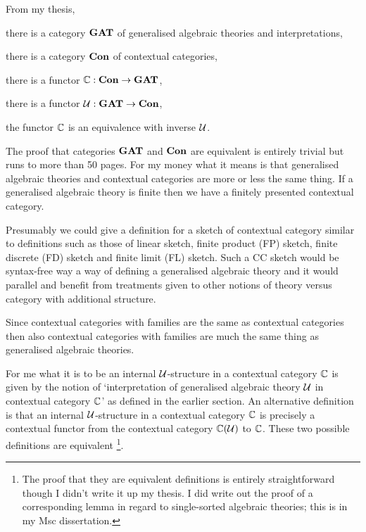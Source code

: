 
\note From my thesis, 
\begin{point}
there is a category $\catGAT$ of generalised algebraic theories and interpretations,
\end{point}
\begin{point}
there is a category $\catCon$ of contextual categories,
\end{point}
\begin{point}
there is a functor $\ccat[C]: \catCon \morph \catGAT$,
\end{point}
\begin{point}
there is a functor $\gat[U]:\catGAT \morph \catCon$,
\end{point}
\begin{point}
the functor $\ccat[C]$ is an equivalence with inverse $\gat[U]$.
\end{point}

\note
The proof that categories $\catGAT$ and $\catCon$ are equivalent  is entirely trivial but runs to more than 50 pages. For my money what it means is that generalised algebraic theories and contextual categories are more or less the same thing. If a generalised algebraic theory is finite then we have a finitely presented contextual category. 

\note
Presumably we could give a definition for a sketch of contextual category 
similar to  definitions such as those of linear sketch, finite product (FP) sketch, finite discrete (FD) sketch and finite limit (FL) sketch. Such a CC sketch would be syntax-free way a way of defining a generalised algebraic theory and it would parallel and benefit from treatments given to other notions of theory versus category with additional structure.

\note
Since contextual categories with families are the same as contextual categories then also
contextual categories with families are much the same thing as generalised algebraic theories. 

\note For me what it is to be an internal $\gat[U]$-structure in a contextual category $\ccat[C]$ is given by the notion of `interpretation of  generalised algebraic theory $\gat[U]$ in  contextual category $\ccat[C]$'
as defined in the earlier section. 
An alternative definition is that an internal $\gat[U]$-structure in a contextual category $\ccat[C]$ is precisely a contextual functor from the contextual category $\CofU$ to $\ccat[C]$. These two possible definitions are equivalent
\footnote{The proof that they are equivalent definitions is entirely straightforward though I didn't write it up my thesis. I did write out the proof of a  corresponding lemma in regard to single-sorted algebraic theories; this is in my Msc dissertation.}.

